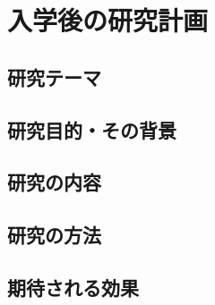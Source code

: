 \section{入学後の研究計画}
\subsection{研究テーマ}
\subsection{研究目的・その背景}
\subsection{研究の内容}
\subsection{研究の方法}
\subsection{期待される効果}
